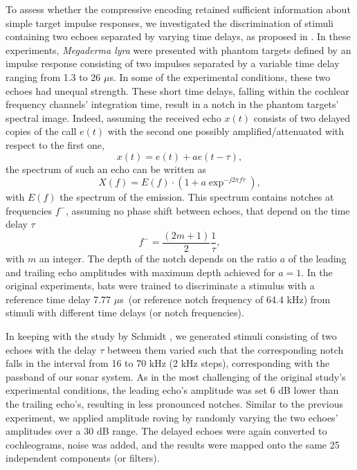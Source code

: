 \documentclass[10pt,letterpaper]{article}
\newcommand{\us}{$\mu$s}
\begin{document}
To assess whether the compressive encoding retained sufficient information about simple target impulse responses, we investigated the discrimination of stimuli containing two echoes separated by varying time delays, as proposed in \cite{Schmidt1992}. In these experiments, \textit{Megaderma lyra} were presented with phantom targets defined by an impulse response consisting of two impulses separated by a variable time delay ranging from 1.3 to 26 \us. In some of the experimental conditions, these two echoes had unequal strength. These short time delays, falling within the cochlear frequency channels' integration time, result in a notch in the phantom targets' spectral image. Indeed, assuming the received echo $x(t)$ consists of two delayed copies of the call $e(t)$ with the second one possibly amplified/attenuated with respect to the first one, 
%
\begin{equation}
x(t) = e(t) + a e(t- \tau),
\end{equation}
%
the spectrum of such an echo can be written as
%
\begin{equation}
X(f) = E(f) \cdot (1+a\exp ^{-j 2 \pi f \tau}),
\end{equation}
%
with $E(f)$ the spectrum of the emission. This spectrum contains notches at 
frequencies $f^{-}$, assuming no phase shift between echoes, that depend on the time delay $\tau$
\begin{equation}
\label{eq:delaym}
f^{-} = \frac{(2 m + 1)}{2} \frac{1}{\tau}, 
\end{equation}
with $m$ an integer. The depth of the notch depends on the ratio $a$ of the leading and trailing echo amplitudes with maximum depth achieved for $a=1$. In the original experiments, bats were trained to discriminate a stimulus with a reference time delay 7.77 \us\ (or reference notch frequency of 64.4 kHz) from stimuli with different time delays (or notch frequencies). 

In keeping with the study by Schmidt \cite{Schmidt1992}, we generated stimuli consisting of two echoes with the delay $\tau$ between them varied such that the corresponding notch falls in the interval from 16 to 70 kHz (2 kHz steps), corresponding with the passband of our sonar system. As in the most challenging of the original study's experimental conditions, the leading echo's amplitude was set 6 dB lower than the trailing echo's, resulting in less pronounced notches. Similar to the previous experiment, we applied amplitude roving by randomly varying the two echoes' amplitudes over a 30 dB range. The delayed echoes were again converted to cochleograms, noise was added, and the results were mapped onto the same 25 independent components (or filters). 
\end{document}
